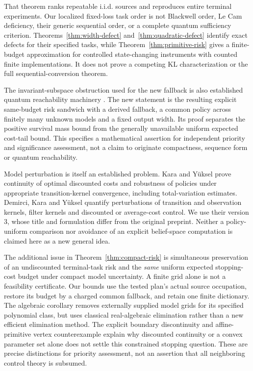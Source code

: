 That theorem ranks repeatable i.i.d. sources and reproduces entire terminal experiments. Our localized fixed-loss task order is not Blackwell order, Le Cam deficiency, their generic sequential order, or a complete quantum sufficiency criterion. Theorems~\ref{thm:width-defect} and~\ref{thm:quadratic-defect} identify exact defects for their specified tasks, while Theorem~\ref{thm:primitive-risk} gives a finite-budget approximation for controlled state-changing instruments with counted finite implementations. It does not prove a competing KL characterization or the full sequential-conversion theorem.

The invariant-subspace obstruction used for the new fallback is also established quantum reachability machinery \cite[Theorem 3.6]{Ying14pre}. The new statement is the resulting explicit same-budget risk sandwich with a derived fallback, a common policy across finitely many unknown models and a fixed output width. Its proof separates the positive survival mass bound from the generally unavailable uniform expected cost-tail bound. This specifies a mathematical assertion for independent priority and significance assessment, not a claim to originate compactness, sequence form or quantum reachability.


Model perturbation is itself an established problem. Kara and Y\"uksel \cite{KaraYuksel20} prove continuity of optimal discounted costs and robustness of policies under appropriate transition-kernel convergence, including total-variation estimates. Demirci, Kara and Y\"uksel \cite{Demirci25} quantify perturbations of transition and observation kernels, filter kernels and discounted or average-cost control. We use their version 3, whose title and formulation differ from the original preprint. Neither a policy-uniform comparison nor avoidance of an explicit belief-space computation is claimed here as a new general idea.

The additional issue in Theorem~\ref{thm:compact-risk} is simultaneous preservation of an undiscounted terminal-task risk and the \emph{same} uniform expected stopping-cost budget under compact model uncertainty. A finite grid alone is not a feasibility certificate. Our bounds use the tested plan's actual source occupation, restore its budget by a charged common fallback, and retain one finite dictionary. The algebraic corollary removes externally supplied model grids for its specified polynomial class, but uses classical real-algebraic elimination rather than a new efficient elimination method. The explicit boundary discontinuity and affine-primitive vertex counterexample explain why discounted continuity or a convex parameter set alone does not settle this constrained stopping question. These are precise distinctions for priority assessment, not an assertion that all neighboring control theory is subsumed.
